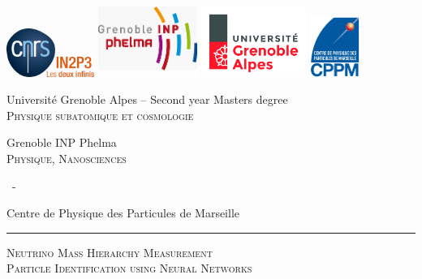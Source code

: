 \documentclass[11pt]{report}
\begin{document}
\thispagestyle{empty}
\begin{center}
    \centering
    \includegraphics[height=45pt]{fig/logo_cnrs.jpg}\hspace{30pt}
    \includegraphics[height=65pt]{fig/Logo_Phelma.png}\hspace{30pt}
    \includegraphics[height=65pt]{fig/logo_uga_vo_cmjn.jpg}\hspace{30pt}
    \includegraphics[height=55pt]{fig/logo_cppm.png}\par
    \vspace{1cm}
    {\large Université Grenoble Alpes -- Second year Masters degree \\ [3pt] \textsc{Physique subatomique et cosmologie}\par}
    {\large Grenoble INP Phelma \\ [3pt] \textsc{Physique, Nanosciences}\par}
    \vspace{8pt}
    {\ - \par}
    \vspace{8pt}
    {\large Centre de Physique des Particules de Marseille\par}
    \vspace{12pt}
    \rule{\linewidth}{1pt}\par
    \vspace{2pt}
    \LARGE{\textsc{Neutrino Mass Hierarchy Measurement \\[2pt] Particle Identification using Neural Networks}}

\end{center}
\end{document}
